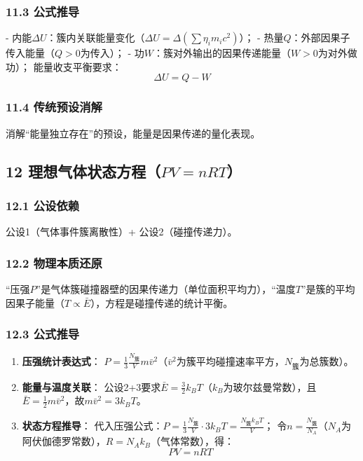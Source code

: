 \documentclass{article}
\newcommand{\et}{\eta}           %
\begin{document}
\subsubsection{11.3 公式推导}
- 内能$\Delta U$：簇内关联能量变化（$\Delta U = \Delta (\sum \et_i m_i c^2)$）；  
- 热量$Q$：外部因果子传入能量（$Q>0$为传入）；  
- 功$W$：簇对外输出的因果传递能量（$W>0$为对外做功）；  
能量收支平衡要求：  
$$\Delta U = Q - W$$

\subsubsection{11.4 传统预设消解}
消解“能量独立存在”的预设，能量是因果传递的量化表现。


\subsection{12 理想气体状态方程（$PV = nRT$）}
\subsubsection{12.1 公设依赖}
公设1（气体事件簇离散性）+ 公设2（碰撞传递力）。

\subsubsection{12.2 物理本质还原}
“压强$P$”是气体簇碰撞器壁的因果传递力（单位面积平均力），“温度$T$”是簇的平均因果子能量（$T \propto \bar{E}$），方程是碰撞传递的统计平衡。

\subsubsection{12.3 公式推导}
\begin{enumerate}
    \item \textbf{压强统计表达式}：  
      $P = \frac{1}{3} \frac{N_{\text{簇}}}{V} m \bar{v}^2$（$\bar{v}^2$为簇平均碰撞速率平方，$N_{\text{簇}}$为总簇数）。
    
    \item \textbf{能量与温度关联}：  
      公设2+3要求$\bar{E} = \frac{3}{2} k_B T$（$k_B$为玻尔兹曼常数），且$\bar{E} = \frac{1}{2} m \bar{v}^2$，故$m \bar{v}^2 = 3 k_B T$。
    
    \item \textbf{状态方程推导}：  
      代入压强公式：$P = \frac{1}{3} \frac{N_{\text{簇}}}{V} \cdot 3 k_B T = \frac{N_{\text{簇}} k_B T}{V}$；  
      令$n = \frac{N_{\text{簇}}}{N_A}$（$N_A$为阿伏伽德罗常数），$R = N_A k_B$（气体常数），得：  
      $$PV = nRT$$
\end{enumerate}
\end{document}
